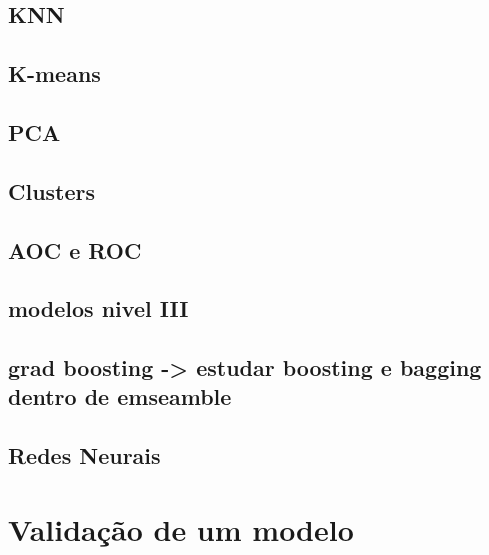 \documentclass[
]{book}
\begin{document}
\hypertarget{knn}{%
\section{KNN}\label{knn}}

\hypertarget{k-means}{%
\section{K-means}\label{k-means}}

\hypertarget{pca}{%
\section{PCA}\label{pca}}

\hypertarget{clusters}{%
\section{Clusters}\label{clusters}}

\hypertarget{aoc-e-roc}{%
\section{AOC e ROC}\label{aoc-e-roc}}

\hypertarget{modelos-nivel-iii}{%
\section{modelos nivel III}\label{modelos-nivel-iii}}

\hypertarget{grad-boosting---estudar-boosting-e-bagging-dentro-de-emseamble}{%
\section{grad boosting -\textgreater{} estudar boosting e bagging dentro de emseamble}\label{grad-boosting---estudar-boosting-e-bagging-dentro-de-emseamble}}

\hypertarget{redes-neurais}{%
\section{Redes Neurais}\label{redes-neurais}}

\hypertarget{validauxe7uxe3o-de-um-modelo}{%
\chapter{Validação de um modelo}\label{validauxe7uxe3o-de-um-modelo}}
\end{document}
